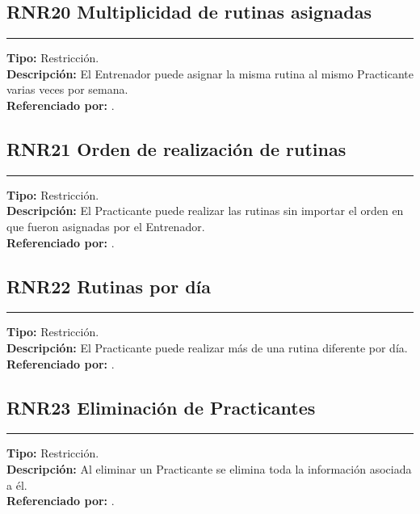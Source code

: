 \subsection{\normalsize{\textcolor[rgb]{0, 0, 0.545098}{RNR20 Multiplicidad de rutinas asignadas}}}
\label{rn:RNR20}
\rule[3mm]{16.59cm}{0.1mm} \vspace{1mm}
\textbf{Tipo:} Restricción.\\
\textbf{Descripción:} El Entrenador puede asignar la misma rutina al mismo Practicante varias veces por semana.\\
\textbf{Referenciado por: }  .\\

\subsection{\normalsize{\textcolor[rgb]{0, 0, 0.545098}{RNR21 Orden de realización de rutinas}}}
\label{rn:RNR21}
\rule[3mm]{16.59cm}{0.1mm} \vspace{1mm}
\textbf{Tipo:} Restricción.\\
\textbf{Descripción:} El Practicante puede realizar las rutinas sin importar el orden en que fueron asignadas por el Entrenador.\\
\textbf{Referenciado por: }  .\\

\subsection{\normalsize{\textcolor[rgb]{0, 0, 0.545098}{RNR22 Rutinas por día}}}
\label{rn:RNR22}
\rule[3mm]{16.59cm}{0.1mm} \vspace{1mm}
\textbf{Tipo:} Restricción.\\
\textbf{Descripción:} El Practicante puede realizar más de una rutina diferente por día.\\
\textbf{Referenciado por: }  .\\

\subsection{\normalsize{\textcolor[rgb]{0, 0, 0.545098}{RNR23 Eliminación de Practicantes}}}
\label{rn:RNR23}
\rule[3mm]{16.59cm}{0.1mm} \vspace{1mm}
\textbf{Tipo:} Restricción.\\
\textbf{Descripción:} Al eliminar un Practicante se elimina toda la información asociada a él.\\
\textbf{Referenciado por: }  .\\

